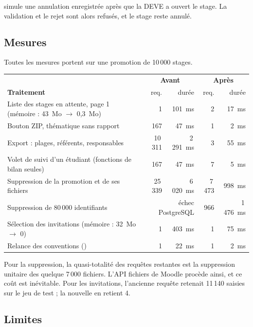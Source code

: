 \documentclass[11pt,a4paper]{article}
\newcommand{\code}[1]{\texttt{\detokenize{#1}}}
\begin{document}
\code{race.php} simule une annulation enregistrée après que la DEVE a ouvert le stage. La
validation et le rejet sont alors refusés, et le stage reste annulé.

\subsection{Mesures}

Toutes les mesures portent sur une promotion de 10\,000 stages.

\begin{center}
\small
\begin{tabularx}{\linewidth}{@{}X r r r r@{}}
\toprule
& \multicolumn{2}{c}{\textbf{Avant}} & \multicolumn{2}{c}{\textbf{Après}} \\
\textbf{Traitement} & req. & durée & req. & durée \\
\midrule
Liste des stages en attente, page 1 (mémoire : 43~Mo $\to$ 0,3~Mo) & 1 & 101~ms & 2 & 17~ms \\
Bouton ZIP, thématique sans rapport & 167 & 47~ms & 1 & 2~ms \\
Export : plages, référents, responsables & 10\,311 & 2\,291~ms & 3 & 55~ms \\
Volet de suivi d'un étudiant (fonctions de bilan seules) & 167 & 47~ms & 7 & 5~ms \\
Suppression de la promotion et de ses fichiers & 25\,339 & 6\,020~ms & 7\,473 & 998~ms \\
Suppression de 80\,000 identifiants & \multicolumn{2}{r}{échec PostgreSQL} & 966 & 1\,476~ms \\
Sélection des invitations (mémoire : 32~Mo $\to$ 0) & 1 & 403~ms & 1 & 75~ms \\
Relance des conventions (\code{EXPLAIN}) & 1 & 22~ms & 1 & 2~ms \\
\bottomrule
\end{tabularx}
\end{center}

Pour la suppression, la quasi-totalité des requêtes restantes est la suppression unitaire des
quelque 7\,000 fichiers. L'API fichiers de Moodle procède ainsi, et ce coût est inévitable. Pour
les invitations, l'ancienne requête retenait 11\,140 saisies sur le jeu de test ; la nouvelle en
retient 4.

\subsection{Limites}\label{sec:limites}
\end{document}
